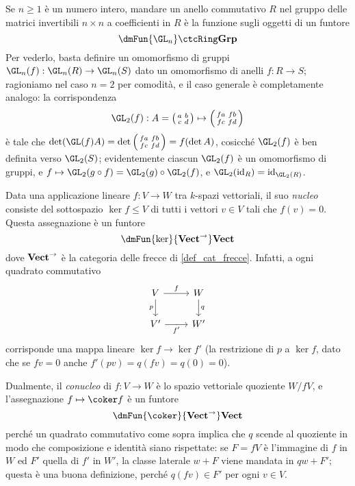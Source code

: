 \begin{example}
	Se $n\ge 1$ è un numero intero, mandare un anello commutativo $R$ nel gruppo delle matrici invertibili $n\times n$ a coefficienti in $R$ è la funzione sugli oggetti di un funtore 
	\[\dmFun{\GL_n}\ctcRing\ctGrp\]
	Per vederlo, basta definire un omomorfismo di gruppi $\GL_n(f) : \GL_n(R)\to \GL_n(S)$ dato un omomorfismo di anelli $f : R\to S$; ragioniamo nel caso $n=2$ per comodità, e il caso generale è completamente analogo: la corrispondenza
	\[\GL_2(f) : A=\left(\begin{smallmatrix}
		a	&	b \\ 
		c	&	d
		\end{smallmatrix}\right)
		\mapsto 
		\left(\begin{smallmatrix}
			fa	&	fb \\ 
			fc	&	fd
			\end{smallmatrix}\right)
			\]
			è tale che $\det(\GL(f)A)=\det\left(\begin{smallmatrix}
				fa	&	fb \\ 
				fc	&	fd
				\end{smallmatrix}\right) = f(\det A)$, cosicché $\GL_2(f)$ è ben definita verso $\GL_2(S)$; evidentemente ciascun $\GL_2(f)$ è un omomorfismo di gruppi, e $f\mapsto\GL_2(g\circ f) = \GL_2(g)\circ\GL_2(f)$, e $\GL_2(\id_R) = \id_{\GL_2(R)}$.
\end{example}
\begin{example}
	Data una applicazione lineare $f : V\to W$ tra $k$-spazi vettoriali, il suo \emph{nucleo} consiste del sottospazio $\ker f\le V$ di tutti i vettori $v\in V$ tali che $f(v)=0$. Questa assegnazione è un funtore 
	\[\dmFun{\ker}{\ctVect^\to}\ctVect\]
	dove $\mathbf{Vect}^\to$ è la categoria delle frecce di \ref{def_cat_frecce}. Infatti, a ogni quadrato commutativo 
	\[\begin{tikzcd}
		V \ar[r, "f"]\ar[d, "p"']& W\ar[d, "q"] \\ 
		V' \ar[r, "{f'}"'] & W'
	\end{tikzcd}\]
	corrisponde una mappa lineare $\ker f \to \ker f'$ (la restrizione di $p$ a $\ker f$, dato che se $fv=0$ anche $f'(pv)=q(fv)=q(0)=0$).

	Dualmente, il \emph{conucleo} di $f : V\to W$ è lo spazio vettoriale quoziente $W/fV$, e l'assegnazione $f\mapsto \coker f$ è un funtore 
	\[\dmFun{\coker}{\ctVect^\to}\ctVect\]
	perché un quadrato commutativo come sopra implica che $q$ scende al quoziente in modo che composizione e identità siano rispettate: se $F = fV$ è l'immagine di $f$ in $W$ ed $F'$ quella di $f'$ in $W'$, la classe laterale $w + F$ viene mandata in $qw+F'$; questa è una buona definizione, perché $q(fv) \in F'$ per ogni $v\in V$.
\end{example}
